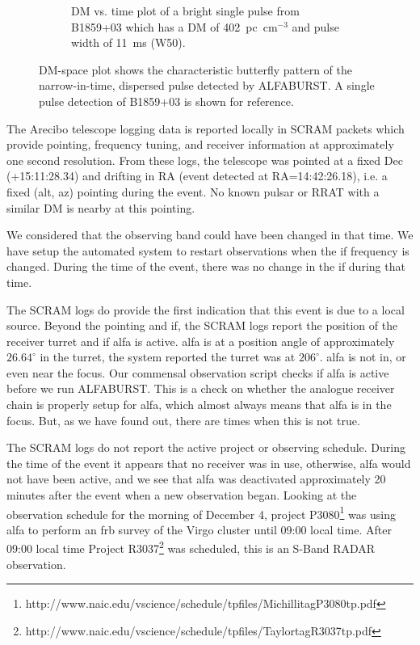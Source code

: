 \documentclass[a4paper,fleqn,usenatbib]{mnras}
\begin{document}
\begin{figure}
\begin{subfigure}[t]{0.5\textwidth}
        \caption{DM vs. time plot of a bright single pulse from B1859+03 which
        has a DM of 402~pc~cm$^{-3}$ and pulse width of 11~ms (W50).
        }
        \label{fig:dm_time_B1859}
    \end{subfigure}
    \caption{DM-space plot shows the characteristic butterfly pattern of the
    narrow-in-time, dispersed pulse detected by ALFABURST. A single pulse
    detection of B1859+03 is shown for reference.
    }
    \label{fig:dm_time}
\end{figure}

The Arecibo telescope logging data is reported locally in SCRAM packets which
provide pointing, frequency tuning, and receiver information at approximately
one second resolution. From these logs, the telescope was pointed at a fixed Dec
(+15:11:28.34) and drifting in RA (event detected at RA=14:42:26.18), i.e. a
fixed (alt, az) pointing during the event. No known pulsar or RRAT with a similar
DM is nearby at this pointing.

We considered that the observing band could have been changed in that time.  We
have setup the automated system to restart observations when the \gls{if}
frequency is changed.  During the time of the event, there was no change in the
\gls{if} during that time.

The SCRAM logs do provide the first indication that this event is due to a local
source. Beyond the pointing and \gls{if}, the SCRAM logs report the position of
the receiver turret and if \gls{alfa} is active. \gls{alfa} is at a position
angle of approximately $26.64^{\circ}$ in the turret, the system reported the
turret was at $206^{\circ}$. \gls{alfa} is not in, or even near the focus.  Our
commensal observation script checks if \gls{alfa} is active before we run
ALFABURST. This is a check on whether the analogue receiver chain is properly
setup for \gls{alfa}, which almost always means that \gls{alfa} is in the focus.
But, as we have found out, there are times when this is not true.

The SCRAM logs do not report the active project or observing schedule. During
the time of the event it appears that no receiver was in use, otherwise,
\gls{alfa} would not have been active, and we see that \gls{alfa} was
deactivated approximately 20 minutes after the event when a new observation
began.  Looking at the observation schedule for the morning of December 4,
project
P3080\footnote{http://www.naic.edu/vscience/schedule/tpfiles/MichillitagP3080tp.pdf}
was using \gls{alfa} to perform an \gls{frb} survey of the Virgo cluster until
09:00 local time.  After 09:00 local time Project
R3037\footnote{http://www.naic.edu/vscience/schedule/tpfiles/TaylortagR3037tp.pdf}
was scheduled, this is an S-Band RADAR observation. 
\end{document}
